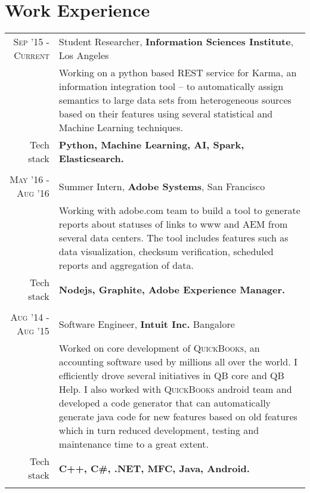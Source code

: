 \section{Work Experience}
\renewcommand{\arraystretch}{0.85}%
\begin{tabular}{r|p{13cm}}

\textsc{Sep '15 - Current} & Student Researcher, \textbf{Information Sciences Institute}, Los Angeles \\
& \small{Working on a python based REST service for Karma, an information integration tool – to automatically assign semantics to large data sets from heterogeneous sources based on their features using several statistical and Machine Learning techniques.}\\
\small{Tech stack} &\footnotesize{\textbf{Python, Machine Learning, AI, Spark, Elasticsearch.}} \\
\multicolumn{2}{c}{} \\

\textsc{May '16 - Aug '16} & Summer Intern, \textbf{Adobe Systems}, San Francisco \\
& \small{Working with adobe.com team to build a tool to generate reports about statuses of links to www and AEM from several data centers. The tool includes features such as data visualization, checksum verification, scheduled reports and aggregation of data.}\\
\small{Tech stack} &\footnotesize{\textbf{Nodejs, Graphite, Adobe Experience Manager.}} \\
\multicolumn{2}{c}{} \\

\textsc{Aug '14 - Aug '15 } & Software Engineer, \textbf{Intuit Inc.} Bangalore \\
& \small{Worked on core development of \textsc{QuickBooks}, an accounting software used by millions all over the world. I efficiently drove several initiatives in QB core and QB Help. I also worked with \textsc{QuickBooks} android team and developed a code generator that can automatically generate java code for new features based on old features which in turn reduced development, testing and maintenance time to a great extent.}\\
\small{Tech stack} &\footnotesize{\textbf{C++, C\#, .NET, MFC, Java, Android.}} \\
\multicolumn{2}{c}{}



\end{tabular}
